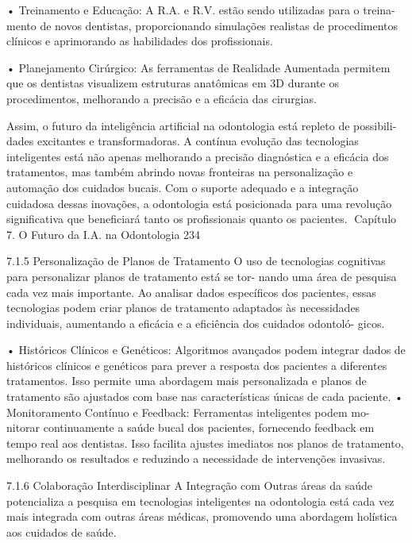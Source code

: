     • Treinamento e Educação: A R.A. e R.V. estão sendo utilizadas para o treina-
      mento de novos dentistas, proporcionando simulações realistas de procedimentos
      clínicos e aprimorando as habilidades dos profissionais.

    • Planejamento Cirúrgico: As ferramentas de Realidade Aumentada permitem que
      os dentistas visualizem estruturas anatômicas em 3D durante os procedimentos,
      melhorando a precisão e a eficácia das cirurgias.

        Assim, o futuro da inteligência artificial na odontologia está repleto de possibili-
dades excitantes e transformadoras. A contínua evolução das tecnologias inteligentes
está não apenas melhorando a precisão diagnóstica e a eficácia dos tratamentos, mas
também abrindo novas fronteiras na personalização e automação dos cuidados bucais.
Com o suporte adequado e a integração cuidadosa dessas inovações, a odontologia
está posicionada para uma revolução significativa que beneficiará tanto os profissionais
quanto os pacientes.
Capítulo 7. O Futuro da I.A. na Odontologia                                           234


7.1.5     Personalização de Planos de Tratamento
O uso de tecnologias cognitivas para personalizar planos de tratamento está se tor-
nando uma área de pesquisa cada vez mais importante. Ao analisar dados específicos
dos pacientes, essas tecnologias podem criar planos de tratamento adaptados às
necessidades individuais, aumentando a eficácia e a eficiência dos cuidados odontoló-
gicos.

    • Históricos Clínicos e Genéticos: Algoritmos avançados podem integrar dados
      de históricos clínicos e genéticos para prever a resposta dos pacientes a diferentes
      tratamentos. Isso permite uma abordagem mais personalizada e planos de
      tratamento são ajustados com base nas características únicas de cada paciente.
    • Monitoramento Contínuo e Feedback: Ferramentas inteligentes podem mo-
      nitorar continuamente a saúde bucal dos pacientes, fornecendo feedback em
      tempo real aos dentistas. Isso facilita ajustes imediatos nos planos de tratamento,
      melhorando os resultados e reduzindo a necessidade de intervenções invasivas.

7.1.6     Colaboração Interdisciplinar
A Integração com Outras áreas da saúde potencializa a pesquisa em tecnologias
inteligentes na odontologia está cada vez mais integrada com outras áreas médicas,
promovendo uma abordagem holística aos cuidados de saúde.

